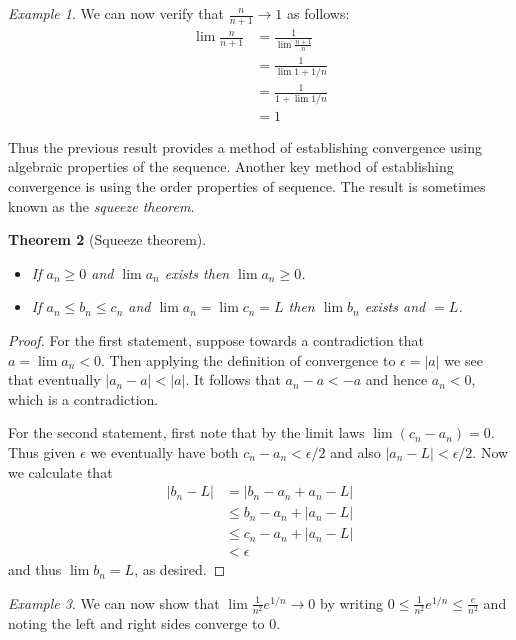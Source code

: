 \documentclass[11pt,oneside]{amsbook}
\theoremstyle{definition}
\theoremstyle{plain}
\newtheorem{thm}{Theorem}[section]
\theoremstyle{definition}
\theoremstyle{remark}
\newtheorem{example}[thm]{Example}
\numberwithin{equation}{section}
\numberwithin{figure}{section}
\begin{document}
\begin{example}
  We can now verify that $\frac{n}{n+1}\to1$ as follows:
  \begin{align*}
    \lim\frac{n}{n+1}&=\frac1{\lim\frac{n+1}{n}}\\
    &=\frac1{\lim 1+1/n}\\
    &=\frac1{1+\lim 1/n}\\
    &=1
  \end{align*}
\end{example}

Thus the previous result provides a method of establishing convergence using algebraic properties of the sequence. Another key method of establishing convergence is using the order properties of sequence. The result is sometimes known as the \emph{squeeze theorem}.

\begin{thm}[Squeeze theorem]\
  \begin{itemize}
  \item If $a_n\geq0$ and $\lim a_n$ exists then $\lim a_n\geq0$.
  \item If $a_n\leq b_n\leq c_n$ and $\lim a_n=\lim c_n=L$ then $\lim b_n$ exists and $=L$.
  \end{itemize}
\end{thm}

\begin{proof}
  For the first statement, suppose towards a contradiction that $a=\lim a_n<0$. Then applying the definition of convergence to $\epsilon=|a|$ we see that eventually $|a_n-a|<|a|$. It follows that $a_n-a<-a$ and hence $a_n<0$, which is a contradiction.

  For the second statement, first note that by the limit laws $\lim(c_n-a_n)=0$. Thus given $\epsilon$ we eventually have both $c_n-a_n<\epsilon/2$ and also $|a_n-L|<\epsilon/2$. Now we calculate that
  \begin{align*}
    |b_n-L|&=|b_n-a_n+a_n-L|\\
    &\leq b_n-a_n+|a_n-L|\\
    &\leq c_n-a_n+|a_n-L|\\
    &<\epsilon
  \end{align*}
  and thus $\lim b_n=L$, as desired.
\end{proof}

\begin{example}
  We can now show that $\lim\frac{1}{n^2}e^{1/n}\to0$ by writing $0\leq\frac{1}{n^2}e^{1/n}\leq\frac{e}{n^2}$ and noting the left and right sides converge to $0$.
\end{example}
\end{document}
